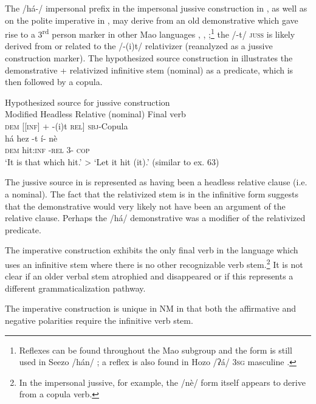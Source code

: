 \documentclass[output=paper]{langsci/langscibook}
\begin{document}
The /h\'{a}-/ impersonal prefix in the impersonal jussive construction in , as well as on the polite imperative in , may derive from an old demonstrative which gave rise to a 3\textsuperscript{rd} person marker in other Mao languages \citep[206]{Bender2000}, \citep[245-246]{Ahland2012}, \citep{Ahland2015};\footnote{Reflexes can be found throughout the Mao subgroup and the form is still used in Seezo /h\'{a}n/ \citep{Mengistu2015}; a reflex is also found in Hozo /ʔ\'{a}/ \textsc{3sg} masculine \citep{Kassa2014}.} the /-t/ \textsc{juss} is likely derived from or related to the /-(i)t/ relativizer (reanalyzed as a jussive construction marker). The hypothesized source construction in  illustrates the demonstrative + relativized infinitive stem (nominal) as a predicate, which is then followed by a copula. 

\ea\label{ex:mahland:65}
Hypothesized source for jussive construction\\
Modified Headless Relative (nominal)  Final verb\\
\textsc{dem   [[inf}] + -(i)t \textsc{rel]}                \textsc{sbj-}Copula\\
\gll h\'{a}  hez         {}-t                    \'{i}-   n\`{e}     \\
\textsc{dem}    hit\textsc{:inf}   \textsc{{}-rel}                3-   \textsc{cop}\\
\glt `It is that which hit.' {\textgreater} `Let it hit (it).' (similar to ex. 63)
\z

The jussive source in  is represented as having been a headless relative clause (i.e. a nominal). The fact that the relativized stem is in the infinitive form suggests that the demonstrative would very likely not have been an argument of the relative clause. Perhaps the /h\'{a}/ demonstrative was a modifier of the relativized predicate.

The imperative construction exhibits the only final verb in the language which uses an infinitive stem where there is no other recognizable verb stem.\footnote{ In the impersonal jussive, for example, the /n\`{e}/ form itself appears to derive from a copula verb.} It is not clear if an older verbal stem atrophied and disappeared or if this represents a different grammaticalization pathway. 

The imperative construction  is unique in NM in that both the affirmative and negative polarities require the infinitive verb stem.  
\end{document}
